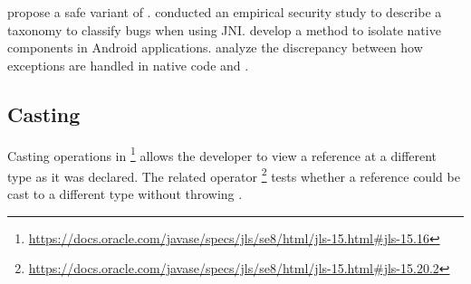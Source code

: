 
\cite{tanSafeJavaNative2006} propose a safe variant of \jni{}.
\cite{tanEmpiricalSecurityStudy2008,kondohFindingBugsJava2008} conducted an empirical security study to describe a taxonomy to classify bugs when using JNI.
\cite{sunNativeGuardProtectingAndroid2014} develop a method to isolate native components in Android applications.
\cite{liFindingBugsExceptional2009} analyze the discrepancy between how exceptions are handled in native code and \java{}.

\subsection{Casting}
\label{sec:lr:casting}

Casting operations in \java
\footnote{\url{https://docs.oracle.com/javase/specs/jls/se8/html/jls-15.html\#jls-15.16}}
allows the developer to view a reference at a different type as it was declared.
The related  operator%
\footnote{\url{https://docs.oracle.com/javase/specs/jls/se8/html/jls-15.html\#jls-15.20.2}}
tests whether a reference could be cast to a different type without
throwing .

